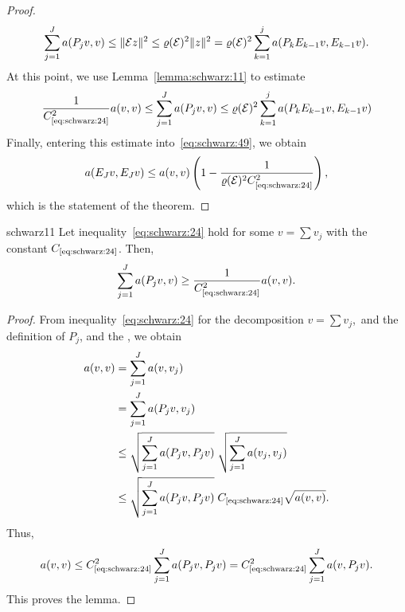 \begin{proof}
  \begin{gather}
    \label{eq:schwarz:48}
    \sum_{j=1}^J a(P_j v,v) \le \lVert\mathcal E z\rVert^2
    \le \varrho(\mathcal E)^2 \lVert z\rVert^2
    = \varrho(\mathcal E)^2 \sum_{k=1}^{j} a(P_k E_{k-1} v,E_{k-1} v).
  \end{gather}
  At this point, we use Lemma~\ref{lemma:schwarz:11} to estimate
  \begin{gather*}
    \frac1{\constref{eq:schwarz:24}^2} a(v,v)
    \le \sum_{j=1}^J a(P_j v,v)
    \le \rho(\mathcal E)^2 \sum_{k=1}^{j} a(P_k E_{k-1} v,E_{k-1} v)
  \end{gather*}
  Finally, entering this estimate into~\eqref{eq:schwarz:49}, we
  obtain
  \begin{gather*}
    a(E_J v, E_J v)
    \le a(v,v) \left(1-\frac1{\rho(\mathcal
        E)^2\constref{eq:schwarz:24}^2}
      \right),
  \end{gather*}
  which is the statement of the theorem.
\end{proof}

\begin{Lemma}{schwarz11}
  \label{lemma:schwarz:11}
  Let inequality~\eqref{eq:schwarz:24} hold for some  $v=\sum v_j$ with the constant
  $\constref{eq:schwarz:24}$. Then,
  \begin{gather}
    \label{eq:schwarz:50}
    \sum_{j=1}^J a(P_j v,v) \ge \frac1{\constref{eq:schwarz:24}^2} a(v,v).
  \end{gather}
\end{Lemma}

\begin{proof}
  From inequality~\eqref{eq:schwarz:24} for the decomposition $v=\sum
  v_j$,\ and the definition of $P_j$, and the
  , we obtain
  \begin{align*}
    a(v,v) &= \sum_{j=1}^J a(v,v_j) \\
    &= \sum_{j=1}^J a(P_j v, v_j) \\
    &\le \sqrt{\sum_{j=1}^J a(P_j v, P_j v)} \;\sqrt{\sum_{j=1}^J a(v_j,
      v_j)} \\
    & \le \sqrt{\sum_{j=1}^J a(P_j v, P_j v)}\;
    \constref{eq:schwarz:24} \sqrt{a(v,v)}.
  \end{align*}
  Thus,
  \begin{gather*}
    a(v,v) \le \constref{eq:schwarz:24}^2 \sum_{j=1}^J a(P_j v, P_j v)
    = \constref{eq:schwarz:24}^2 \sum_{j=1}^J a(v, P_j v).
  \end{gather*}
  This proves the lemma.
\end{proof}
